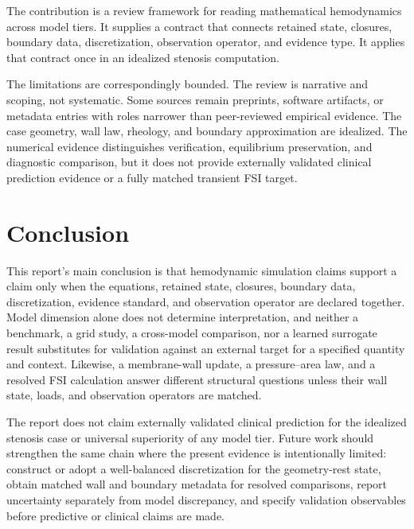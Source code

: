 The contribution is a review framework for reading mathematical hemodynamics
across model tiers. It supplies a contract that connects retained state,
closures, boundary data, discretization, observation operator, and evidence
type. It applies that contract once in an idealized stenosis computation.

The limitations are correspondingly bounded. The review is narrative and
scoping, not systematic. Some sources remain preprints, software artifacts, or
metadata entries with roles narrower than peer-reviewed empirical evidence. The
case geometry, wall law, rheology, and boundary approximation are idealized.
The numerical evidence distinguishes verification, equilibrium preservation,
and diagnostic comparison, but it does not provide externally validated
clinical prediction evidence or a fully matched transient FSI target.

\section{Conclusion}
\label{sec:conclusions-limitations}

This report's main conclusion is that hemodynamic simulation claims support a
claim only when the equations, retained state, closures, boundary data,
discretization, evidence standard, and observation operator are declared
together. Model dimension alone does not determine interpretation, and neither
a benchmark, a grid study, a cross-model comparison, nor a learned surrogate
result substitutes for validation against an external target for a specified
quantity and context.
Likewise, a membrane-wall update, a pressure--area law, and a resolved FSI
calculation answer different structural questions unless their wall state,
loads, and observation operators are matched.

The report does not claim externally validated clinical prediction for the
idealized stenosis case or universal superiority of any model tier. Future work
should strengthen the same chain where the present evidence is intentionally
limited: construct or adopt a well-balanced discretization for the
geometry-rest state, obtain matched wall and boundary metadata for resolved
comparisons, report uncertainty separately from model discrepancy, and specify
validation observables before predictive or clinical claims are made.
